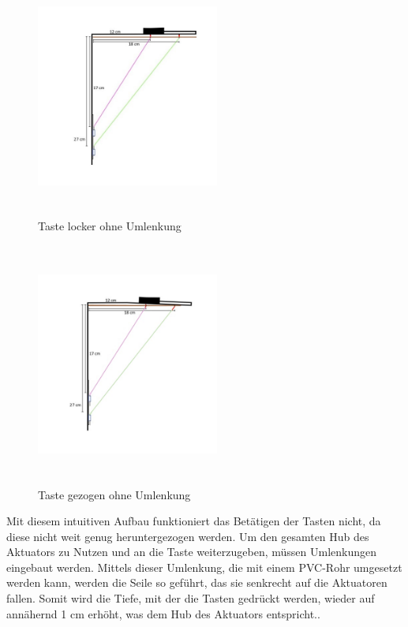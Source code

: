\begin{figure}[htbp]
	\centering
	\includegraphics[width=6cm, height=8cm]{img/Umlenkung_locker}
	\caption{Taste locker ohne Umlenkung}
	\label{img:Umlenkung_locker}
\end{figure}

\begin{figure}[htbp]
	\centering
	\includegraphics[width=6cm, height=8cm]{img/Umlenkung_gezogen}
	\caption{Taste gezogen ohne Umlenkung}
	\label{img:Umlenkung_gezogen}
\end{figure}

\newpage

Mit diesem intuitiven Aufbau funktioniert das Betätigen der Tasten nicht, da diese nicht weit genug heruntergezogen werden.
Um den gesamten Hub des Aktuators zu Nutzen und an die Taste weiterzugeben, müssen Umlenkungen eingebaut werden.
Mittels dieser Umlenkung, die mit einem PVC-Rohr umgesetzt werden kann, werden die Seile so geführt, das sie senkrecht auf die Aktuatoren fallen.
Somit wird die Tiefe, mit der die Tasten gedrückt werden, wieder auf annähernd 1 cm erhöht, was dem Hub des Aktuators entspricht..

